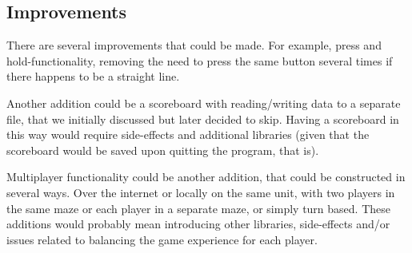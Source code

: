 \documentclass[12pt, a4paper]{article}
\begin{document}
\subsection{Improvements}
There are several improvements that could be made. For example, press and hold-functionality, removing the need to press the same button several times if there happens to be a straight line.

Another addition could be a scoreboard with reading/writing data to a separate file, that we initially discussed but later decided to skip. Having a scoreboard in this way would require side-effects and additional libraries (given that the scoreboard would be saved upon quitting the program, that is).

Multiplayer functionality could be another addition, that could be constructed in several ways. Over the internet or locally on the same unit, with two players in the same maze or each player in a separate maze, or simply turn based. These additions would probably mean introducing other libraries, side-effects and/or issues related to balancing the game experience for each player.

\newpage



\end{document}
